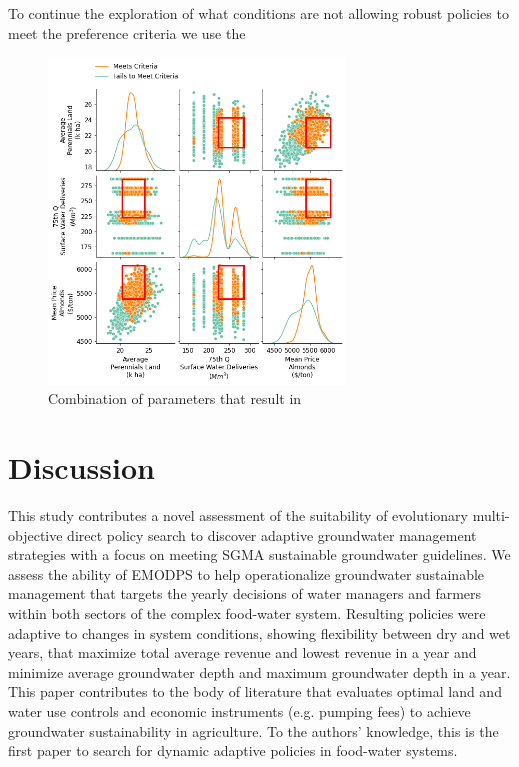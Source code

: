 \documentclass[a4paper,fleqn]{cas-sc}
\begin{document}
To continue the exploration of what conditions are not allowing robust policies to meet the preference criteria we use the 

\begin{figure}[htb!]
    \includegraphics[width=0.7\textwidth,center]{./figs/prim_robust_mindepth.png}
    \caption{Combination of parameters that result in } \label{fig:9}
\end{figure}

\clearpage
\section{Discussion}

This study contributes a novel assessment of the suitability of evolutionary multi-objective direct policy search to discover adaptive groundwater management strategies with a focus on meeting SGMA sustainable groundwater guidelines. We assess the ability of EMODPS to help operationalize groundwater sustainable management that targets the yearly decisions of water managers and farmers within both sectors of the complex food-water system. Resulting policies were adaptive to changes in system conditions, showing flexibility between dry and wet years, that maximize total average revenue and lowest revenue in a year and minimize average groundwater depth and maximum groundwater depth in a year. This paper contributes to the body of literature that evaluates optimal land and water use controls and economic instruments (e.g. pumping fees) to achieve groundwater sustainability in agriculture. To the authors’ knowledge, this is the first paper to search for dynamic adaptive policies in food-water systems.  
\end{document}
